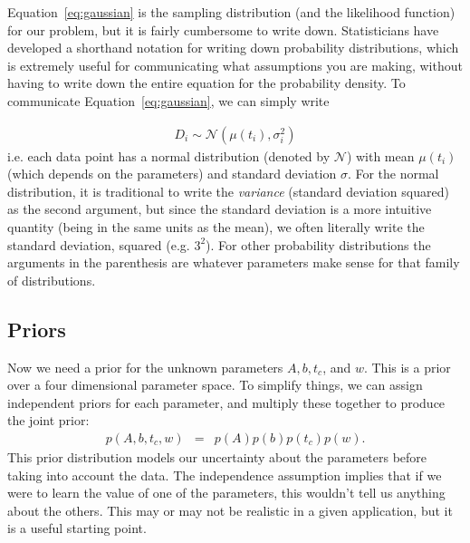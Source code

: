 Equation~\ref{eq:gaussian} is the sampling distribution
(and the likelihood function) for our problem, but it
is fairly cumbersome to write down. Statisticians have developed a shorthand
notation for writing down probability distributions, which is extremely useful
for communicating what assumptions you are making, without having to write down
the entire equation for the probability density. To communicate
Equation~\ref{eq:gaussian}, we can simply write

\begin{eqnarray}
D_i \sim \mathcal{N}\left(\mu(t_i), \sigma_i^2\right)
\end{eqnarray}
i.e. each data point has a normal distribution (denoted by $\mathcal{N}$)
with mean $\mu(t_i)$ (which
depends on the parameters) and standard deviation $\sigma$. For the normal
distribution, it is traditional to write the {\it variance} (standard deviation
squared) as the second argument, but since the standard deviation is a more
intuitive quantity (being in the same units as the mean), we often literally
write the standard deviation, squared (e.g. $3^2$). For other probability
distributions the arguments in the parenthesis are whatever parameters make
sense for that family of distributions.

\subsection{Priors}
Now we need a prior for the unknown parameters $A, b, t_c$, and $w$. This is
a prior over a four dimensional parameter space. To simplify things, we can
assign independent priors for each parameter, and multiply these together
to produce the joint prior:
\begin{eqnarray}
p(A, b, t_c, w) &=& p(A)p(b)p(t_c)p(w).
\end{eqnarray}
This prior distribution models our uncertainty about the parameters before
taking into account the data. The independence assumption implies that if we
were to learn the value of one of the parameters, this wouldn't tell us anything
about the others. This may or may not be realistic in a given application, but
it is a useful starting point.

